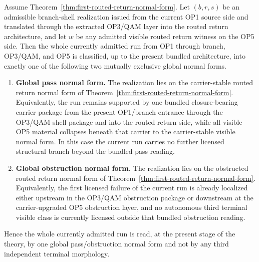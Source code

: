 \begin{theorem}
\label{thm:first-global-pass-obstruction-normal-form}
Assume Theorem~\ref{thm:first-routed-return-normal-form}. Let $(b,r,s)$ be an admissible
branch-shell realization issued from the current OP1 source side and translated through the
extracted OP3/QAM layer into the routed return architecture, and let $w$ be any admitted
visible routed return witness on the OP5 side. Then the whole currently admitted run from OP1
through branch, OP3/QAM, and OP5 is classified, up to the present bundled architecture, into
exactly one of the following two mutually exclusive global normal forms.
\begin{enumerate}[leftmargin=2em,label=(\roman*)]
\item \textbf{Global pass normal form.}
The realization lies on the carrier-stable routed return normal form of
Theorem~\ref{thm:first-routed-return-normal-form}. Equivalently, the run remains supported by
one bundled closure-bearing carrier package from the present OP1/branch entrance through the
OP3/QAM shell package and into the routed return side, while all visible OP5 material collapses
beneath that carrier to the carrier-stable visible normal form. In this case the current run
carries no further licensed structural branch beyond the bundled pass reading.
\item \textbf{Global obstruction normal form.}
The realization lies on the obstructed routed return normal form of
Theorem~\ref{thm:first-routed-return-normal-form}. Equivalently, the first licensed failure of
the current run is already localized either upstream in the OP3/QAM obstruction package or
downstream at the carrier-upgraded OP5 obstruction layer, and no autonomous third terminal
visible class is currently licensed outside that bundled obstruction reading.
\end{enumerate}
Hence the whole currently admitted run is read, at the present stage of the theory, by one
global pass/obstruction normal form and not by any third independent terminal morphology.
\end{theorem}

